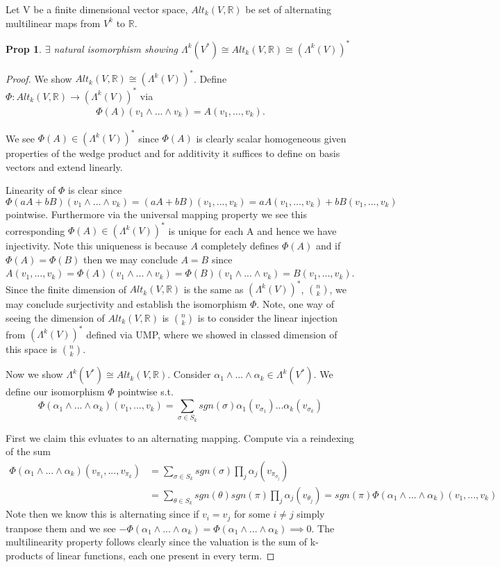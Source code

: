\documentclass[11pt]{article}
\newcommand{\R}{\mathbb{R}}
\newtheorem{prop}{Prop}
\begin{document}
Let V be a finite dimensional vector space, $Alt_k(V,\R)$ be set of alternating multilinear maps from $V^k$ to $\R$. 

\begin{prop}
	$\exists$ natural isomorphism showing $\Lambda^k(V^*) \cong Alt_k(V,\R) \cong (\Lambda^k(V))^*$
\end{prop}

\begin{proof}
	
	We show $Alt_k(V,\R) \cong (\Lambda^k(V))^*$. Define $\Phi:Alt_k(V,\R) \to (\Lambda^k(V))^*$ via
	\begin{align*}
		\Phi(A)(v_1\wedge ... \wedge v_k) = A(v_1,...,v_k).
	\end{align*}
	
	We see $\Phi(A) \in (\Lambda^k(V))^*$ since $\Phi(A)$ is clearly scalar homogeneous given properties of the wedge product and for additivity it suffices to define on basis vectors and extend linearly.

	Linearity of $\Phi$ is clear since $\Phi(aA + bB)(v_1 \wedge ... \wedge v_k) = (aA + bB) (v_1,...,v_k) = aA(v_1,...,v_k) + bB(v_1,...,v_k)$ pointwise. Furthermore via the universal mapping property we see this corresponding $\Phi(A) \in (\Lambda^k(V))^*$ is unique for each A and hence we have injectivity. Note this uniqueness is because $A$ completely defines $\Phi(A)$ and if $\Phi(A) = \Phi(B)$ then we may conclude $A = B$ since $A(v_1,...,v_k) = \Phi(A)(v_1 \wedge ... \wedge v_k) = \Phi(B) (v_1 \wedge ... \wedge v_k) = B(v_1,...,v_k)$. Since the finite dimension of $Alt_k(V,\R)$ is the same as $(\Lambda^k(V))^*$, ${n \choose k}$, we may conclude surjectivity and establish the isomorphism $\Phi$. Note, one way of seeing the dimension of $Alt_k(V,\R)$ is ${n \choose k}$ is to consider the linear injection from $(\Lambda^k(V))^*$ defined via UMP, where we showed in classed dimension of this space is ${n \choose k}$.

	Now we show $\Lambda^k(V^*) \cong Alt_k(V,\R)$. Consider $\alpha_1 \wedge ... \wedge \alpha_k \in \Lambda^k(V^*)$. We define our isomorphism $\Phi$ pointwise s.t.
	\[
		\Phi(\alpha_1 \wedge ... \wedge \alpha_k)(v_1,...,v_k) = \sum_{\sigma \in S_k} sgn(\sigma)\alpha_1(v_{\sigma_1})...\alpha_k(v_{\sigma_k})
	\]

	First we claim this evluates to an alternating mapping. Compute via a reindexing of the sum
	\begin{align*}
		\Phi(\alpha_1 \wedge ... \wedge \alpha_k)(v_{\pi_1},...,v_{\pi_k}) &= \sum_{\sigma \in S_k} sgn(\sigma)\prod_j \alpha_j(v_{\pi_{\sigma_j}}) \\
		 &= \sum_{\theta \in S_k} sgn(\theta)sgn(\pi)\prod_j \alpha_j(v_{\theta_j}) = sgn(\pi)\Phi(\alpha_1\wedge ... \wedge \alpha_k)(v_1,...,v_k) 
	\end{align*}
	Note then we know this is alternating since if $v_i = v_j$ for some $i\neq j$ simply tranpose them and we see $-\Phi(\alpha_1 \wedge ... \wedge \alpha_k) = \Phi(\alpha_1 \wedge ... \wedge \alpha_k)\implies0$. The multilinearity property follows clearly since the valuation is the sum of k-products of linear functions, each one present in every term. 


\end{proof}
\end{document}

